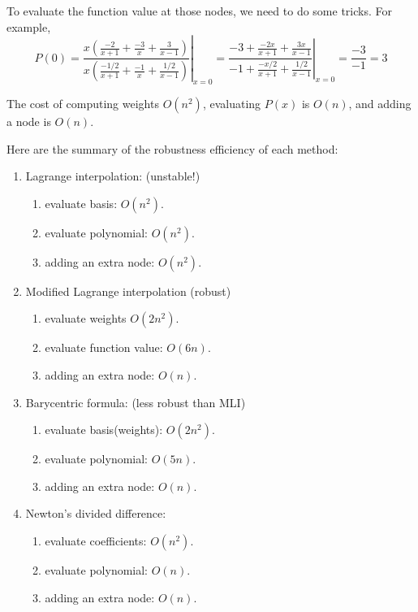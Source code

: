 \begin{enumerate}
\begin{solution}
		 
		To evaluate the function value at those nodes, we need to do some tricks. For example,
		\[ P(0) = \left. \frac{ x \left(\frac{-2}{x+1} + \frac{-3}{x} +\frac{3}{x-1} \right) }{ x\left(\frac{-1/2}{x+1} + \frac{-1}{x} + \frac{1/2}{x-1}\right)} \right|_{x=0} 
		=\left. \frac{-3 + \frac{-2x}{x+1} +\frac{3x}{x-1}}{-1 + \frac{-x/2}{x+1} + \frac{1/2}{x-1} }\right|_{x=0} = \frac{-3}{-1} = 3 \]
	\end{solution}
	The cost of computing weights $O(n^2)$, evaluating $P(x)$ is $O(n)$, and adding a node is $O(n)$.
\end{enumerate}

\begin{summary}
	Here are the summary of the robustness efficiency of each method:
	\begin{enumerate}
		\item
		Lagrange interpolation: (unstable!)
		\begin{enumerate}
			\item 
			evaluate basis: $O(n^2)$.
			\item 
			evaluate polynomial: $O(n^2)$.
			\item 
			adding an extra node: $O(n^2)$.
		\end{enumerate}
		
		\item 
		Modified Lagrange interpolation (robust)
		\begin{enumerate}
			\item 
			evaluate weights $O(2n^2)$.
			\item 
			evaluate function value: $O(6n)$.
			\item 
			adding an extra node: $O(n)$. 
		\end{enumerate}
		
		\item 
		Barycentric formula: (less robust than MLI)
		\begin{enumerate}
			\item 
			evaluate basis(weights): $O(2n^2)$.
			\item 
			evaluate polynomial: $O(5n)$.
			\item 
			adding an extra node: $O(n)$.
		\end{enumerate}
		\item 
		Newton's divided difference:
		\begin{enumerate}
			\item 
			evaluate coefficients: $O(n^2)$.
			\item 
			evaluate polynomial: $O(n)$.
			\item 
			adding an extra node: $O(n)$.
		\end{enumerate}
		
	\end{enumerate}
\end{summary}

